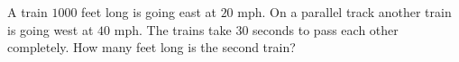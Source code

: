 A train $1000$ feet long is going east at $20$ mph. On a parallel track another train is going west at $40$ mph. The trains take $30$ seconds to pass each other completely. How many feet long is the second train?
